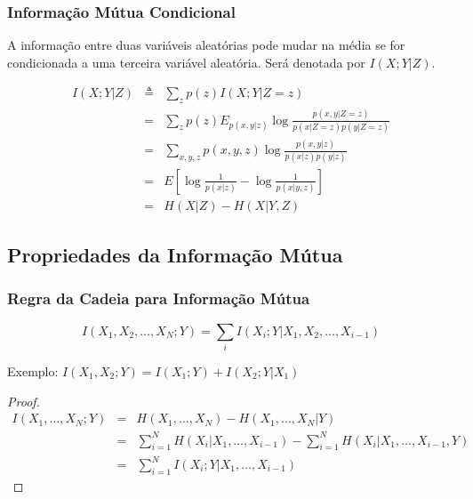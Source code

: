 \begin{frame}%
  \frametitle{Informação Mútua Condicional}
   A informação entre duas variáveis aleatórias pode mudar na média se for condicionada 
   a uma terceira variável aleatória. Será denotada por $I(X;Y|Z)$.
   \begin{definition}
   \vspace{-0.3cm}
   \begin{eqnarray}
     I(X;Y|Z) &\triangleq& \sum_z p(z) I(X;Y|Z=z) \nonumber \\
                &=& \sum_z p(z) E_{p(x,y|z)} \log \frac{p(x,y|Z=z)}{p(x|Z=z) p(y|Z=z)} \nonumber \\
                &=& \sum_{x,y,z} p(x,y,z) \log \frac{p(x,y|z)}{p(x|z)p(y|z)} \nonumber \\
                &=& E \left[ \log \frac{1}{p(x|z)} - \log \frac{1}{p(x|y,z)} \right] \nonumber \\
                &=& H(X|Z) - H(X|Y,Z)
   \end{eqnarray}
   \end{definition}
\end{frame}



\subsection{Propriedades da Informação Mútua}
\begin{frame}%
  \frametitle{Regra da Cadeia para Informação Mútua}
   \begin{proposition} \vspace{-0.2cm}
   \begin{equation}
   I(X_1,X_2,\ldots,X_N;Y) = \sum_i I(X_i;Y|X_1,X_2,\ldots,X_{i-1})
   \end{equation}
   \end{proposition}
   
   Exemplo: $I(X_1,X_2;Y) = I(X_1;Y) + I(X_2;Y|X_1)$
   \begin{proof} \vspace{-0.6cm}
   \begin{eqnarray}
        I(X_1,\ldots,X_N;Y) &=& H(X_1,\ldots,X_N) - H(X_1,\ldots,X_N|Y) \nonumber \\
                &=& \sum_{i=1}^N H(X_i|X_1,\ldots,X_{i-1}) - \sum_{i=1}^N H(X_i|X_1,\ldots,X_{i-1},Y) \nonumber \\
                &=& \sum_{i=1}^N I(X_i;Y|X_1,\ldots,X_{i-1}) 
   \end{eqnarray}
   \end{proof}
\end{frame}

